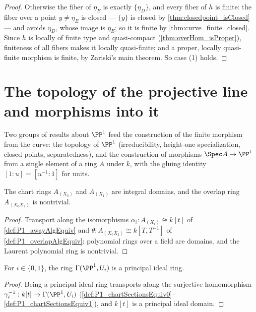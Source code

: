 \begin{proof}
  Otherwise the fiber of \(\eta_E\) is exactly \(\{\eta_D\}\), and every fiber of
  \(h\) is finite: the fiber over a point \(y \neq \eta_E\) is closed --- \(\{y\}\) is
  closed by \ref{thm:closedpoint_isClosed} --- and avoids \(\eta_D\), whose image is
  \(\eta_E\); so it is finite by \ref{thm:curve_finite_closed}. Since \(h\) is locally
  of finite type and quasi-compact (\ref{thm:overHom_isProper}), finiteness of all
  fibers makes it locally quasi-finite; and a proper, locally quasi-finite morphism is
  finite, by Zariski's main theorem. So case (1) holds.
\end{proof}

\section{The topology of the projective line and morphisms into it}

Two groups of results about \(\PP^1\) feed the construction of the finite morphism from
the curve: the topology of \(\PP^1\) (irreducibility, height-one specialization, closed
points, separatedness), and the construction of morphisms \(\Spec A \to \PP^1\) from a
single element of a ring \(A\) under \(k\), with the gluing identity
\([1 : u] = [u^{-1} : 1]\) for units.

\begin{lemma}
  \label{lem:P1_away_domains}
  \leanok
  The chart rings \(A_{(X_0)}\) and \(A_{(X_1)}\) are integral domains, and the overlap
  ring \(A_{(X_0X_1)}\) is nontrivial.
\end{lemma}
\begin{proof}
  \leanok
  Transport along the isomorphisms \(\alpha_i : A_{(X_i)} \cong k[t]\) of
  \ref{def:P1_awayAlgEquiv} and \(\theta : A_{(X_0X_1)} \cong k[T,T^{-1}]\) of
  \ref{def:P1_overlapAlgEquiv}: polynomial rings over a field are domains, and the Laurent
  polynomial ring is nontrivial.
\end{proof}

\begin{lemma}
  \label{lem:P1_chartSections_pid}
  \leanok
  For \(i \in \{0,1\}\), the ring \(\Gamma(\PP^1, U_i)\) is a principal ideal ring.
\end{lemma}
\begin{proof}
  \leanok
  Being a principal ideal ring transports along the surjective homomorphism
  \(\gamma_i^{-1} : k[t] \to \Gamma(\PP^1, U_i)\)
  (\ref{def:P1_chartSectionsEquiv0}--\ref{def:P1_chartSectionsEquiv1}), and \(k[t]\) is a
  principal ideal domain.
\end{proof}

